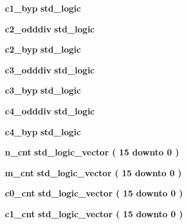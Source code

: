 \begin{DoxyCompactItemize}
{\bf c1\+\_\+byp} {\bfseries {\bfseries \textcolor{comment}{std\+\_\+logic}\textcolor{vhdlchar}{ }}} 
\item 
{\bf c2\+\_\+odddiv} {\bfseries {\bfseries \textcolor{comment}{std\+\_\+logic}\textcolor{vhdlchar}{ }}} 
\item 
{\bf c2\+\_\+byp} {\bfseries {\bfseries \textcolor{comment}{std\+\_\+logic}\textcolor{vhdlchar}{ }}} 
\item 
{\bf c3\+\_\+odddiv} {\bfseries {\bfseries \textcolor{comment}{std\+\_\+logic}\textcolor{vhdlchar}{ }}} 
\item 
{\bf c3\+\_\+byp} {\bfseries {\bfseries \textcolor{comment}{std\+\_\+logic}\textcolor{vhdlchar}{ }}} 
\item 
{\bf c4\+\_\+odddiv} {\bfseries {\bfseries \textcolor{comment}{std\+\_\+logic}\textcolor{vhdlchar}{ }}} 
\item 
{\bf c4\+\_\+byp} {\bfseries {\bfseries \textcolor{comment}{std\+\_\+logic}\textcolor{vhdlchar}{ }}} 
\item 
{\bf n\+\_\+cnt} {\bfseries {\bfseries \textcolor{comment}{std\+\_\+logic\+\_\+vector}\textcolor{vhdlchar}{ }\textcolor{vhdlchar}{(}\textcolor{vhdlchar}{ }\textcolor{vhdlchar}{ } \textcolor{vhdldigit}{15} \textcolor{vhdlchar}{ }\textcolor{keywordflow}{downto}\textcolor{vhdlchar}{ }\textcolor{vhdlchar}{ } \textcolor{vhdldigit}{0} \textcolor{vhdlchar}{ }\textcolor{vhdlchar}{)}\textcolor{vhdlchar}{ }}} 
\item 
{\bf m\+\_\+cnt} {\bfseries {\bfseries \textcolor{comment}{std\+\_\+logic\+\_\+vector}\textcolor{vhdlchar}{ }\textcolor{vhdlchar}{(}\textcolor{vhdlchar}{ }\textcolor{vhdlchar}{ } \textcolor{vhdldigit}{15} \textcolor{vhdlchar}{ }\textcolor{keywordflow}{downto}\textcolor{vhdlchar}{ }\textcolor{vhdlchar}{ } \textcolor{vhdldigit}{0} \textcolor{vhdlchar}{ }\textcolor{vhdlchar}{)}\textcolor{vhdlchar}{ }}} 
\item 
{\bf c0\+\_\+cnt} {\bfseries {\bfseries \textcolor{comment}{std\+\_\+logic\+\_\+vector}\textcolor{vhdlchar}{ }\textcolor{vhdlchar}{(}\textcolor{vhdlchar}{ }\textcolor{vhdlchar}{ } \textcolor{vhdldigit}{15} \textcolor{vhdlchar}{ }\textcolor{keywordflow}{downto}\textcolor{vhdlchar}{ }\textcolor{vhdlchar}{ } \textcolor{vhdldigit}{0} \textcolor{vhdlchar}{ }\textcolor{vhdlchar}{)}\textcolor{vhdlchar}{ }}} 
\item 
{\bf c1\+\_\+cnt} {\bfseries {\bfseries \textcolor{comment}{std\+\_\+logic\+\_\+vector}\textcolor{vhdlchar}{ }\textcolor{vhdlchar}{(}\textcolor{vhdlchar}{ }\textcolor{vhdlchar}{ } \textcolor{vhdldigit}{15} \textcolor{vhdlchar}{ }\textcolor{keywordflow}{downto}\textcolor{vhdlchar}{ }\textcolor{vhdlchar}{ } \textcolor{vhdldigit}{0} \textcolor{vhdlchar}{ }\textcolor{vhdlchar}{)}\textcolor{vhdlchar}{ }}} 

\end{DoxyCompactItemize}

